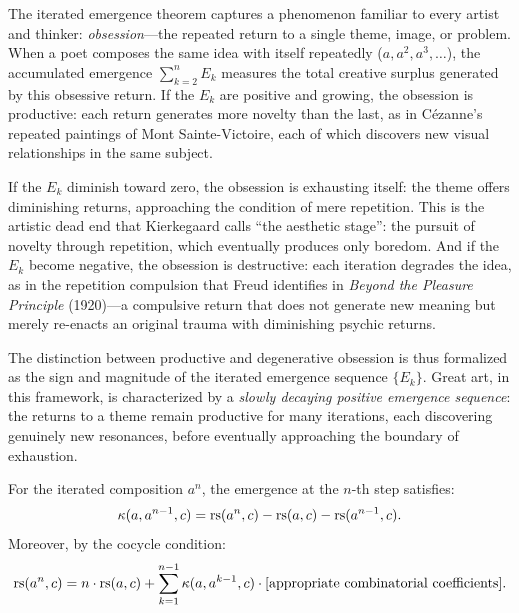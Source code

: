 \begin{interpretation}\label{interp:ch5:iterated_composition_obsession}
The iterated emergence theorem captures a phenomenon familiar to every
artist and thinker: \emph{obsession}---the repeated return to a single
theme, image, or problem. When a poet composes the same idea with itself
repeatedly ($a, a^2, a^3, \ldots$), the accumulated emergence
$\sum_{k=2}^n E_k$ measures the total creative surplus generated by
this obsessive return. If the $E_k$ are positive and growing, the
obsession is productive: each return generates more novelty than the
last, as in Cézanne's repeated paintings of Mont Sainte-Victoire, each
of which discovers new visual relationships in the same subject.

If the $E_k$ diminish toward zero, the obsession is exhausting itself:
the theme offers diminishing returns, approaching the condition of mere
repetition. This is the artistic dead end that Kierkegaard calls ``the
aesthetic stage'': the pursuit of novelty through repetition, which
eventually produces only boredom. And if the $E_k$ become negative,
the obsession is destructive: each iteration degrades the idea, as in
the repetition compulsion that Freud identifies in \emph{Beyond the
Pleasure Principle} (1920)---a compulsive return that does not generate
new meaning but merely re-enacts an original trauma with diminishing
psychic returns.

The distinction between productive and degenerative obsession is thus
formalized as the sign and magnitude of the iterated emergence sequence
$\{E_k\}$. Great art, in this framework, is characterized by a
\emph{slowly decaying positive emergence sequence}: the returns to a
theme remain productive for many iterations, each discovering genuinely
new resonances, before eventually approaching the boundary of
exhaustion.
\end{interpretation}

\begin{theorem}\label{thm:iterated-emergence}
For the iterated composition $a^n$, the emergence at the $n$-th step
satisfies:
\[
    \kappa(a, a^{n-1}, c) = \mathrm{rs}(a^n, c) - \mathrm{rs}(a, c) - \mathrm{rs}(a^{n-1}, c).
\]
Moreover, by the cocycle condition:
\[
    \mathrm{rs}(a^n, c) = n \cdot \mathrm{rs}(a, c)
    + \sum_{k=1}^{n-1} \kappa(a, a^{k-1}, c) \cdot [\text{appropriate
    combinatorial coefficients}].
\]
\end{theorem}

